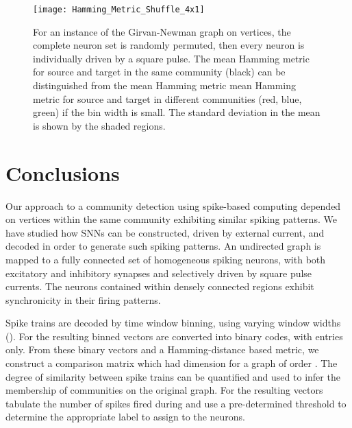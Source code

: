 \documentclass[sigconf]{acmart}
\begin{document}
\begin{figure*}
\centering
\texttt{[image: Hamming\_Metric\_Shuffle\_4x1]}
\caption{For an instance of the Girvan-Newman graph on  vertices, the complete neuron set is randomly permuted, then every neuron is individually driven by a square pulse. The mean Hamming metric  for source and target in the same community (black) can be distinguished from the mean Hamming metric mean Hamming metric  for source and target in different communities (red, blue, green) if the bin width  is small. The standard deviation in the mean is shown by the shaded regions.}
\label{fig:Hamming_metric_2x2}
\end{figure*}
\section{Conclusions}
Our approach to a community detection using spike-based computing depended on vertices within the same community exhibiting similar spiking patterns. We have studied how SNNs can be constructed, driven by external current, and decoded in order to generate such spiking patterns. An undirected graph is mapped to a fully connected set of homogeneous spiking neurons, with both excitatory and inhibitory synapses and selectively driven by square pulse currents. The neurons contained within densely connected regions exhibit synchronicity in their firing patterns.

Spike trains are decoded by time window binning, using varying window widths (). For  the resulting binned vectors are converted into binary codes, with entries  only. From these binary vectors and a Hamming-distance based metric, we construct a comparison matrix which had dimension  for a graph of order . The degree of similarity between spike trains can be quantified and used to infer the membership of communities on the original graph. For  the resulting vectors tabulate the number of spikes fired during  and use a pre-determined threshold to determine the appropriate label to assign to the neurons.  
\end{document}

